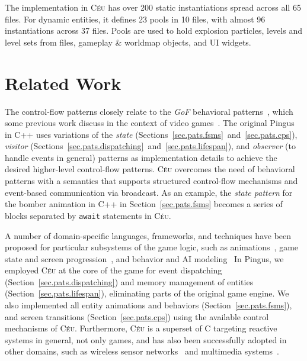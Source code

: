 \documentclass{vgtc}                          %
\newcommand{\CEU}{\textsc{C\'{e}u}\xspace}
\newcommand{\code}[1] {{\small{\texttt{#1}}}}
\begin{document}
The implementation in \CEU has over 200 static instantiations spread across all
65 files.
For dynamic entities, it defines 23 pools in 10 files, with almost 96
instantiations across 37 files.
Pools are used to hold explosion particles, levels and level sets from files,
gameplay \& worldmap objects, and UI widgets.

\section{Related Work}
\label{sec.related}

The control-flow patterns closely relate to the \emph{GoF} behavioral
patterns~\cite{gof}, which some previous work discuss in the context of video
games~\cite{games.patterns,games.gof.2015,games.gof.2007}.
%
The original Pingus in C++ uses variations of the
    \emph{state} (Sections~\ref{sec.pats.fsms}~and~\ref{sec.pats.cps}),
    \emph{visitor} (Sections~\ref{sec.pats.dispatching}~and~\ref{sec.pats.lifespan}), and
    \emph{observer} (to handle events in general)
patterns as implementation details to achieve the desired higher-level
control-flow patterns.
%
\CEU overcomes the need of behavioral patterns with a semantics that supports
structured control-flow mechanisms and event-based communication via broadcast.
%
As an example, the \emph{state pattern} for the bomber animation in C++ in
Section~\ref{sec.pats.fsms} becomes a series of blocks separated by
\code{await} statements in \CEU.

A number of domain-specific languages, frameworks, and techniques have been
proposed for particular subsystems of the game logic, such as
animations~\cite{games.anims.2006,games.anims.2003,games.anims.1996,games.anims.1982},
game state and screen progression~\cite{games.fsms.2006.1,games.fsms.2006.2}, and
behavior and AI modeling~\cite{games.bts,games.bts.unreal}
%
In Pingus, we employed \CEU at the core of the game for event dispatching
(Section~\ref{sec.pats.dispatching}) and memory management of entities
(Section~\ref{sec.pats.lifespan}), eliminating parts of the original game
engine.
We also implemented all entity animations and behaviors
(Section~\ref{sec.pats.fsms}), and screen transitions
(Section~\ref{sec.pats.cps})
using the available control mechanisms of \CEU.
%
Furthermore, \CEU is a superset of C targeting reactive systems in general, not
only games, and has also been successfully adopted in other domains, such as
    wireless sensor networks~\cite{ceu.sensys13,ceu.terra} and
    multimedia systems~\cite{ceu.media.webmedia16}.
\end{document}
